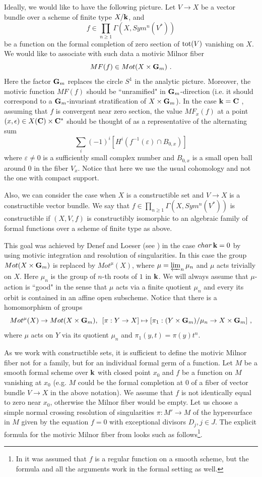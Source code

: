 \documentclass[12pt]{article}
\begin{document}
Ideally, we would like to have the following picture. Let $V\to X$ be a vector bundle over a scheme of finite type $X/{\bf k}$, and 
$$f\in \prod_{n\geqslant 1}\Gamma(X,Sym^n(V^{\ast}))$$ be a function on the formal completion of zero section of $\operatorname{tot}(V)$ vanishing on $X$.
 We would like to associate with such data a motivic Milnor fiber $$MF(f)\in Mot(X\times {\bf G}_m)\,\,.$$ 
 Here the factor ${\bf G}_m$ replaces the circle $S^1$ in the analytic picture.
 Moreover, the motivic function $MF(f)$ should be ``unramified" in ${\bf G}_m$-direction (i.e. it should correspond to a
${\bf G}_m$-invariant stratification of $X\times {\bf G}_m$). In the case ${\bf k}={\bf C}$ , 
assuming that $f$ is convergent near zero section,
the value $MF_x(f)$ at a point $(x,\epsilon)\in X({\bf C})\times {\bf C}^\ast$  should be thought of as a representative of the alternating sum $$\sum_i(-1)^i[H^i(f^{-1}(\varepsilon)\cap B_{0,x})]$$ where $\varepsilon\ne 0$ is a sufficiently small complex number and $B_{0,x}$ is a small open ball around $0$ in the fiber $V_x$. Notice that here we use the usual cohomology and not the one
with compact support.

Also, we can consider the case when $X$ is a constructible set and $V\to X$ is a constructible vector bundle.
We say that $f\in \prod_{n\geqslant 1}\Gamma(X,Sym^n(V^{\ast}))$ is constructible if $(X,V,f)$
is constructibly isomorphic to an algebraic family of formal functions over a scheme of finite type as above.

This goal was achieved by Denef and Loeser (see \cite{DeLo1}) in the case $char\,{\bf k}=0$ by using motivic integration and resolution of singularities. In this case the group $Mot(X\times {\bf G}_m)$ is replaced by $Mot^{\mu}(X)$, where
$\mu=\varprojlim_{n}\mu_n$ and $\mu$ acts trivially on $X$.
Here  $\mu_n$ is the group of $n$-th roots of $1$ in ${\bf k}$. We will always assume that $\mu$-action  is ``good" in the sense that $\mu$ acts via a  finite quotient $\mu_n$ and every its orbit is contained in an affine open subscheme.
Notice that there is a homomorphism of groups $$Mot^{\mu}(X)\to Mot(X\times {\bf G}_m),\,\,\,
[\pi:Y\to X]\mapsto [\pi_1:(Y\times {\bf G}_m)/\mu_n\to X\times {\bf G}_m]\,\,,$$
 where $\mu$ acts on $Y$ via its quotient $\mu_n$ and $\pi_1(y,t)=\pi(y)t^n$.



As we work with constructible sets, it is sufficient to define the motivic Milnor fiber not for a family, but for an individual
 formal germ of a function. Let $M$ be a smooth formal scheme over ${\bf k}$ with closed point $x_0$ and $f$ be a function on $M$
vanishing at $x_0$ (e.g. $M$ could be the formal completion at $0$ of a fiber of vector bundle $V\to X$ in the above notation). We assume that $f$ is not identically equal to zero near $x_0$, otherwise the Milnor fiber would be empty. 
Let us choose a simple normal crossing resolution of singularities $\pi:M'\to M$ of the hypersurface in $M$ given by 
the equation $f=0$ with exceptional divisors $D_j, j\in J$. 
The explicit formula for the motivic Milnor fiber from \cite{DeLo1}   looks such as follows\footnote{In \cite{DeLo1} it was assumed that
$f$ is a regular function on a smooth scheme, but the formula and all the arguments work in the formal setting as well.}.
\end{document}
